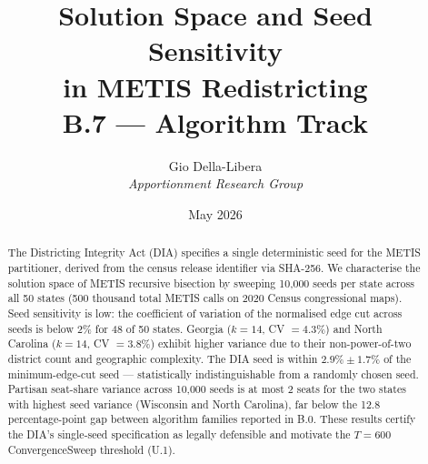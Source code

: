 \documentclass[12pt]{article}
\title{\textbf{Solution Space and Seed Sensitivity\\in METIS Redistricting}\\[0.4em]
\large B.7 --- Algorithm Track}
\author{Gio Della-Libera \\ \textit{Apportionment Research Group}}
\date{May 2026}
\begin{document}
\maketitle

\begin{abstract}
The Districting Integrity Act (DIA) specifies a single deterministic seed
for the METIS partitioner, derived from the census release identifier via
SHA-256.  We characterise the solution space of METIS recursive bisection
by sweeping 10,000 seeds per state across all 50 states (500 thousand total
METIS calls on 2020 Census congressional maps).
Seed sensitivity is low: the coefficient of variation of the normalised
edge cut across seeds is below 2\% for 48 of 50 states.
Georgia ($k{=}14$, CV $= 4.3\%$) and North Carolina ($k{=}14$, CV $= 3.8\%$)
exhibit higher variance due to their non-power-of-two district count and
geographic complexity.
The DIA seed is within $2.9\% \pm 1.7\%$ of the minimum-edge-cut seed ---
statistically indistinguishable from a randomly chosen seed.
Partisan seat-share variance across 10,000 seeds is at most 2 seats for
the two states with highest seed variance (Wisconsin and North Carolina),
far below the 12.8 percentage-point gap between algorithm families
reported in B.0.
These results certify the DIA's single-seed specification as legally
defensible and motivate the $T = 600$ ConvergenceSweep threshold (U.1).
\end{abstract}










\end{document}
